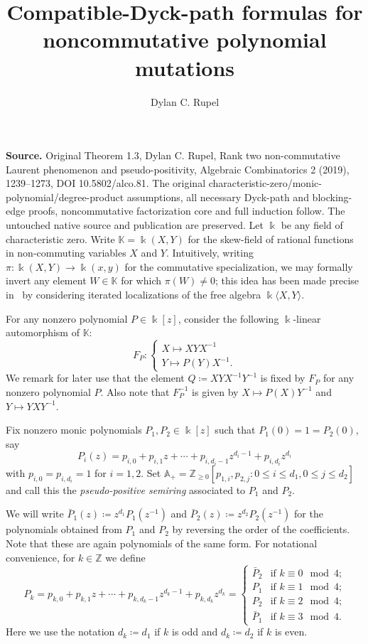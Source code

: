 \documentclass[10pt]{amsart}
\title[Compatible Dyck paths and noncommutative mutation]{Compatible-Dyck-path formulas for noncommutative polynomial mutations}
\author{Dylan C. Rupel}
\date{}
\theoremstyle{definition}
\newcommand{\kk}{\Bbbk}
\renewcommand{\AA}{\mathbb{A}}
\newcommand{\KK}{\mathbb{K}}
\newcommand{\ZZ}{\mathbb{Z}}
\begin{document}
\maketitle
\noindent\textbf{Source.} Original Theorem 1.3, Dylan C. Rupel, Rank two non-commutative Laurent phenomenon and pseudo-positivity, Algebraic Combinatorics 2 (2019), 1239--1273, DOI 10.5802/alco.81. The original characteristic-zero/monic-polynomial/degree-product assumptions, all necessary Dyck-path and blocking-edge proofs, noncommutative factorization core and full induction follow. The untouched native source and publication are preserved.
\setcounter{section}{1}
 \noindent
 Let $\kk$ be any field of characteristic zero. Write $\KK=\kk(X,Y)$ for the skew-field of rational functions in non-commuting variables $X$ and $Y$. Intuitively, writing $\pi:\kk(X,Y)\to\kk(x,y)$ for the commutative specialization, we may formally invert any element $W\in\KK$ for which $\pi(W)\ne0$; this idea has been made precise in~\cite{usnich1} by considering iterated localizations of the free algebra $\kk\langle X,Y\rangle$.

 For any nonzero polynomial $P\in\kk[z]$, consider the following $\kk$-linear automorphism of $\KK$:
 \[F_P:\begin{cases} X\mapsto XYX^{-1}\\ Y\mapsto P(Y)X^{-1}.\end{cases}\]
 We remark for later use that the element $Q\coloneqq XYX^{-1}Y^{-1}$ is fixed by $F_P$ for any nonzero polynomial $P$.
 Also note that $F_P^{-1}$ is given by $X\mapsto P(X)Y^{-1}$ and $Y\mapsto YXY^{-1}$.

 Fix nonzero monic polynomials $P_1,P_2\in\kk[z]$ such that $P_1(0)=1=P_2(0)$, say
 \[P_i(z)=p_{i,0}+p_{i,1}z+\cdots+p_{i,d_i-1}z^{d_i-1}+p_{i,d_i}z^{d_i}\]
 with $p_{i,0}=p_{i,d_i}=1$ for $i=1,2$. Set $\AA_+=\ZZ_{\ge0}[p_{1,i},p_{2,j}:0\le i\le d_1,0\le j\le d_2]$ and call this the \emph{pseudo-positive semiring} associated to $P_1$ and $P_2$. 

 We will write $\bar{P}_1(z)\coloneqq z^{d_1}P_1(z^{-1})$ and $\bar{P}_2(z)\coloneqq z^{d_2}P_2(z^{-1})$ for the polynomials obtained from $P_1$ and $P_2$ by reversing the order of the coefficients. Note that these are again polynomials of the same form. For notational convenience, for $k\in\ZZ$ we define 
 \begin{equation}
 \label{eq:reversed polynomials}
 P_k=p_{k,0}+p_{k,1}z+\cdots+p_{k,d_k-1}z^{d_k-1}+p_{k,d_k}z^{d_k}=\begin{cases}\bar{P}_2 & \text{if $k\equiv 0\mod 4$;}\\P_1 & \text{if $k\equiv 1\mod 4$;}\\P_2 & \text{if $k\equiv 2\mod 4$;}\\\bar{P}_1 & \text{if $k\equiv 3\mod 4$.}\end{cases}
 \end{equation}
 Here we use the notation $d_k\coloneqq d_1$ if $k$ is odd and $d_k\coloneqq d_2$ if $k$ is even.
\end{document}
